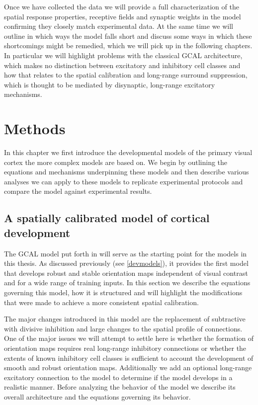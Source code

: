Once we have collected the data we will provide a full
characterization of the spatial response properties, receptive fields
and synaptic weights in the model confirming they closely match
experimental data. At the same time we will outline in which ways the
model falls short and discuss some ways in which these shortcomings
might be remedied, which we will pick up in the following chapters.
In particular we will highlight problems with the classical GCAL
architecture, which makes no distinction between excitatory and
inhibitory cell classes and how that relates to the spatial
calibration and long-range surround suppression, which is thought to
be mediated by disynaptic, long-range excitatory mechanisms.

\section{Methods}

In this chapter we first introduce the developmental models of the
primary visual cortex the more complex models are based on. We begin
by outlining the equations and mechanisms underpinning these models
and then describe various analyses we can apply to these models to
replicate experimental protocols and compare the model against
experimental results.

\subsection{A spatially calibrated model of cortical development} 

The GCAL model put forth in \cite{Stevens2013} will serve as the
starting point for the models in this thesis. As discussed previously
(see \ref{devmodels}), it provides the first model that develops
robust and stable orientation maps independent of visual contrast and
for a wide range of training inputs. In this section we describe the
equations governing this model, how it is structured and will
highlight the modifications that were made to achieve a more
consistent spatial calibration.

The major changes introduced in this model are the replacement of
subtractive with divisive inhibition and large changes to the spatial
profile of connections. One of the major issues we will attempt to
settle here is whether the formation of orientation maps requires real
long-range inhibitory connections or whether the extents of known
inhibitory cell classes is sufficient to account the development of
smooth and robust orientation maps. Additionally we add an optional
long-range excitatory connection to the model to determine if the
model develops in a realistic manner. Before analyzing the behavior of
the model we describe its overall architecture and the equations
governing its behavior.

